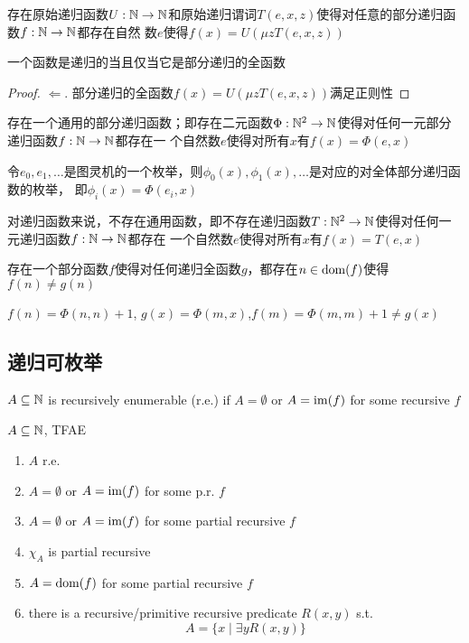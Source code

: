 \documentclass[11pt]{article}
\begin{document}
\begin{theorem}[]
存在原始递归函数\(U:\mathbb{N}\to\mathbb{N}\)和原始递归谓词\(T(e,x,z)\)使得对任意的部分递归函数\(f:\mathbb{N}\to\mathbb{N}\)都存在自然
数\(e\)使得\(f(x)=U(\mu zT(e,x,z))\)
\end{theorem}

\begin{corollary}[]
一个函数是递归的当且仅当它是部分递归的全函数
\end{corollary}

\begin{proof}
\(\Leftarrow\). 部分递归的全函数\(f(x)=U(\mu zT(e,x,z))\)满足正则性
\end{proof}

\begin{theorem}[通用函数定理]
存在一个通用的部分递归函数；即存在二元函数\(\Phi:\mathbb{N}^2\to\mathbb{N}\)使得对任何一元部分递归函数\(f:\mathbb{N}\to\mathbb{N}\)都存在一
个自然数\(e\)使得对所有\(x\)有\(f(x)=\Phi(e,x)\)
\end{theorem}

令\(e_0,e_1,\dots\)是图灵机的一个枚举，则\(\phi_0(x),\phi_1(x),\dots\)是对应的对全体部分递归函数的枚举，
即\(\phi_i(x)=\Phi(e_i,x)\)

\begin{theorem}[]
对递归函数来说，不存在通用函数，即不存在递归函数\(T:\mathbb{N}^2\to\mathbb{N}\)使得对任何一元递归函数\(f:\mathbb{N}\to\mathbb{N}\)都存在
一个自然数\(e\)使得对所有\(x\)有\(f(x)=T(e,x)\)
\end{theorem}

存在一个部分函数\(f\)使得对任何递归全函数\(g\)，都存在\(n\in\operatorname{dom}(f)\)使得\(f(n)\neq g(n)\)

\(f(n)=\Phi(n,n)+1\), \(g(x)=\Phi(m,x)\),\(f(m)=\Phi(m,m)+1\neq g(x)\)
\subsection{递归可枚举}
\label{sec:org943acbf}
\begin{definition}[]
\(A\subseteq\mathbb{N}\) is recursively enumerable (r.e.) if \(A=\emptyset\) or \(A=\operatorname{im}(f)\) for some recursive \(f\)
\end{definition}

\begin{lemma}[]
\(A\subseteq\mathbb{N}\), TFAE
\begin{enumerate}
\item \(A\) r.e.
\item \(A=\emptyset\) or \(A=\operatorname{im}(f)\) for some p.r. \(f\)
\item \(A=\emptyset\) or \(A=\operatorname{im}(f)\) for some partial recursive \(f\)
\item \(\chi_A\) is partial recursive
\item \(A=\operatorname{dom}(f)\) for some partial recursive \(f\)
\item there is a recursive/primitive recursive predicate \(R(x,y)\) s.t.
\begin{equation*}
A=\{x\mid\exists yR(x,y)\}
\end{equation*}
\end{enumerate}
\end{lemma}
\end{document}
